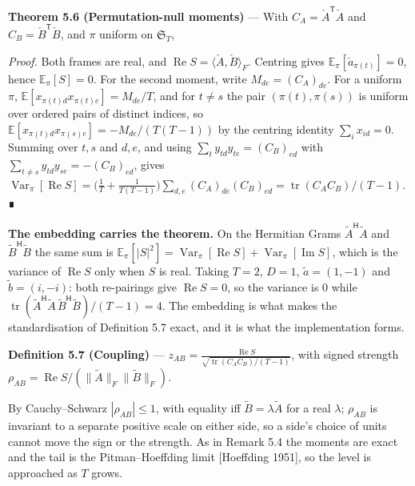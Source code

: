 \documentclass[10pt,letterpaper,twocolumn]{article}
\begin{document}
\textbf{Theorem 5.6 (Permutation-null moments)} --- With \(C_A=\check A^{\mathsf T}\check A\) and \(C_B=\check B^{\mathsf T}\check B\), and \(\pi\) uniform on \(\mathfrak S_T\),


\emph{Proof.} Both frames are real, and \(\operatorname{Re}S=\langle\check A,\check B\rangle_F\). Centring gives \(\mathbb{E}_\pi[\check a_{\pi(t)}]=0\), hence \(\mathbb{E}_\pi[S]=0\). For the second moment, write \(M_{de}=(C_A)_{de}\). For a uniform \(\pi\), \(\mathbb{E}[x_{\pi(t)d}x_{\pi(t)e}]=M_{de}/T\), and for \(t\ne s\) the pair \((\pi(t),\pi(s))\) is uniform over ordered pairs of distinct indices, so \(\mathbb{E}[x_{\pi(t)d}x_{\pi(s)e}]=-M_{de}/(T(T-1))\) by the centring identity \(\sum_i x_{id}=0\). Summing over \(t,s\) and \(d,e\), and using \(\sum_t y_{td}y_{te}=(C_B)_{ed}\) with \(\sum_{t\ne s}y_{td}y_{se}=-(C_B)_{ed}\), gives \(\operatorname{Var}_\pi[\operatorname{Re}S]=\big(\tfrac1T+\tfrac1{T(T-1)}\big)\sum_{d,e}(C_A)_{de}(C_B)_{ed}=\operatorname{tr}(C_AC_B)/(T-1)\). ∎

\textbf{The embedding carries the theorem.} On the Hermitian Grams \(\tilde A^{\mathsf H}\tilde A\) and \(\tilde B^{\mathsf H}\tilde B\) the same sum is \(\mathbb{E}_\pi[|S|^2]=\operatorname{Var}_\pi[\operatorname{Re}S]+\operatorname{Var}_\pi[\operatorname{Im}S]\), which is the variance of \(\operatorname{Re}S\) only when \(S\) is real. Taking \(T=2\), \(D=1\), \(\tilde a=(1,-1)\) and \(\tilde b=(i,-i)\): both re-pairings give \(\operatorname{Re}S=0\), so the variance is \(0\) while \(\operatorname{tr}(\tilde A^{\mathsf H}\tilde A\,\tilde B^{\mathsf H}\tilde B)/(T-1)=4\). The embedding is what makes the standardisation of Definition 5.7 exact, and it is what the implementation forms.

\textbf{Definition 5.7 (Coupling)} --- \(\textstyle z_{AB}=\frac{\operatorname{Re}S}{\sqrt{\operatorname{tr}(C_AC_B)/(T-1)}}\), with signed strength \(\rho_{AB}=\operatorname{Re}S/(\|\tilde A\|_F\|\tilde B\|_F)\).

By Cauchy--Schwarz \(|\rho_{AB}|\le1\), with equality iff \(\tilde B=\lambda\tilde A\) for a real \(\lambda\); \(\rho_{AB}\) is invariant to a separate positive scale on either side, so a side's choice of units cannot move the sign or the strength. As in Remark 5.4 the moments are exact and the tail is the Pitman--Hoeffding limit {[}Hoeffding 1951{]}, so the level is approached as \(T\) grows.
\end{document}
